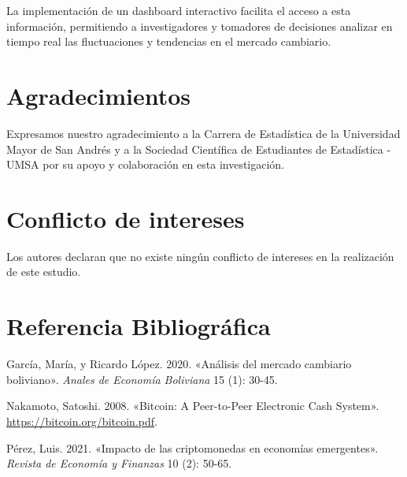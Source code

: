 \documentclass[
  letterpaper,
  DIV=11,
  numbers=noendperiod]{scrartcl}
\newlength{\cslhangindent}
\newenvironment{CSLReferences}[2] %
 {\begin{list}{}{%
  \setlength{\itemindent}{0pt}
  \setlength{\leftmargin}{0pt}
  \setlength{\parsep}{0pt}
  \ifodd #1
   \setlength{\leftmargin}{\cslhangindent}
   \setlength{\itemindent}{-1\cslhangindent}
  \fi
  \setlength{\itemsep}{#2\baselineskip}}}
 {\end{list}}
\begin{document}
La implementación de un dashboard interactivo facilita el acceso a esta
información, permitiendo a investigadores y tomadores de decisiones
analizar en tiempo real las fluctuaciones y tendencias en el mercado
cambiario.

\section*{Agradecimientos}\label{agradecimientos}

Expresamos nuestro agradecimiento a la Carrera de Estadística de la
Universidad Mayor de San Andrés y a la Sociedad Científica de
Estudiantes de Estadística - UMSA por su apoyo y colaboración en esta
investigación.

\section*{Conflicto de intereses}\label{conflicto-de-intereses}

Los autores declaran que no existe ningún conflicto de intereses en la
realización de este estudio.

\section*{Referencia Bibliográfica}\label{referencia-bibliogruxe1fica}

\label{refs}
\begin{CSLReferences}{1}{0}
García, María, y Ricardo López. 2020. {«Análisis del mercado cambiario
boliviano»}. \emph{Anales de Economía Boliviana} 15 (1): 30-45.

Nakamoto, Satoshi. 2008. {«Bitcoin: A Peer-to-Peer Electronic Cash
System»}. \url{https://bitcoin.org/bitcoin.pdf}.

Pérez, Luis. 2021. {«Impacto de las criptomonedas en economías
emergentes»}. \emph{Revista de Economía y Finanzas} 10 (2): 50-65.

\end{CSLReferences}
\end{document}
